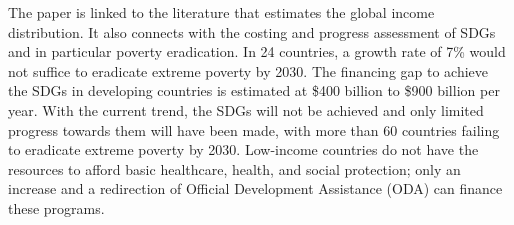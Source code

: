 The paper is linked to the literature that estimates the global income distribution.\cite{pinkovskiy_parametric_2009,anand_chapter_2015,lahoti_global_2016,lakner_global_2016,gradin_trends_2021,jorda_global_2019,alvaredo_methods_2021} 
It also connects with the costing and progress assessment of SDGs and in particular poverty eradication.\cite{schmidt-traub_investment_2015,rozenberg_beyond_2019,sdsn_sdg_2019,manuel_financing_2020,vorisek_understanding_2020,unctad_estimating_2021,un_sustainable_2022} In 24 countries, a growth rate of 7\% would not suffice to eradicate extreme poverty by 2030.\cite{unctad_estimating_2021} The financing gap to achieve the SDGs in developing countries is estimated at \$400 billion\cite{sdsn_sdg_2019} to \$900 billion\cite{kharas_building_2019} per year. With the current trend, the SDGs will not be achieved and only limited progress towards them will have been made, with more than 60 countries failing to eradicate extreme poverty by 2030.\cite{moyer_are_2020} %
Low-income countries do not have the resources to afford basic healthcare, health, and social protection; only an increase and a redirection of Official Development Assistance (ODA) can finance these programs.\cite{manuel_financing_2018} 

